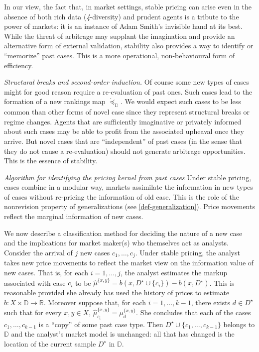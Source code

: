 \documentclass[ecta,nameyear,draft]{econsocart}
\newcommand{\R}{\mathbb R}
\newcommand{\mbbd}{{\mathds D}}
\newcommand{\past}{{D^\star}}
\newcommand{\fourdiv}{\textit{4}-\textup{diversity}}
\theoremstyle{plain}
\theoremstyle{remark}
\begin{document}
%

In our view, the fact that, in market settings, stable pricing can arise even
in the absence of both rich data (\fourdiv) and prudent agents is a tribute to
the power of markets: it is an instance of Adam Smith's invisible hand at its
best. While the threat of arbitrage may supplant the imagination and provide an
alternative form of external validation, stability also provides a way to
identify or ``memorize'' past cases. This is a more operational,
non-behavioural form of efficiency.

\emph{Structural breaks and second-order induction.} Of course some new
types of cases might for good reason require a re-evaluation of past ones. Such
cases lead to the formation of a new rankings map $\grave{\preceq}_{\mbbd}$. We
would expect such cases to be less common than other forms of novel case since
they represent structural breaks or regime changes.  Agents that are
sufficiently imaginative or privately informed about such cases may be able to
profit from the associated upheaval once they arrive. But novel cases that are
``independent'' of past cases (in the sense that they do not cause a
re-evaluation) should not generate arbitrage opportunities. This is the essence
of stability.

\emph{Algorithm for identifying the pricing kernel from past cases} Under
stable pricing, cases combine in a modular way, markets assimilate the
information in new types of cases without re-pricing the information of old
case. This is the role of the nonrevision property of generalizations (see
\cref{def-generalization}).  Price movements reflect the marginal information
of new cases. 

We now describe a classification method for deciding the nature of a new case
and the implications for market maker(s) who themselves act as analysts.
Consider the arrival of $j$ new cases ${c}_1, \dots, {c}_j$.  Under stable
pricing, the analyst takes new price movements to reflect the market view on
the information value of new cases.  That is, for each $i = 1,\dots, j$, the
analyst estimates the markup associated with case $c_i$ to be
$\hat{\mu}^{\{x,y\}} = b(x, \past \cup \{c_i\}) - b(x, \past) $.  This is
reasonable provided she already has used the history of prices to estimate
$b:X\times \mbbd \rightarrow \R$. Moreover suppose that, for each $i = 1,
\dots, k-1$, there exists $d\in \past$ such that for every $x,y \in X$,
$\hat{\mu}^{\{x,y\}}_{c_i} = \mu^{\{x,y\}}_{d}$.  She concludes that each of
the cases $c_1, \dots, c_{k-1}$ is a ``copy'' of some past case type. Then
$\past \cup \{c_1, \dots, c_{k-1}\}$ belongs to $\mbbd$ and the analyst's
market model is unchanged: all that has changed is the location of the current
sample $\past$ in $\mbbd$.
\end{document}
